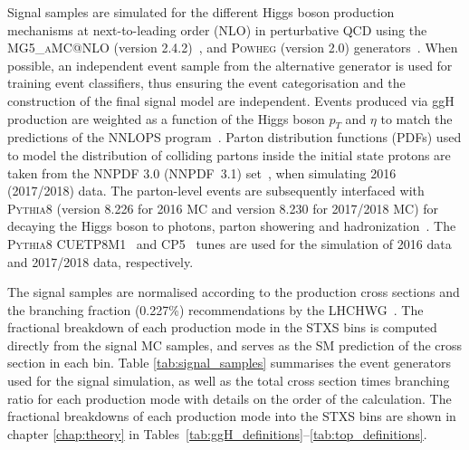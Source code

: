 Signal samples are simulated for the different Higgs boson production mechanisms at next-to-leading order (NLO) in perturbative QCD using the \textsc{MG5\_aMC@NLO} (version 2.4.2)~\cite{Alwall:2014hca}, and \textsc{Powheg} (version 2.0) generators~\cite{Nason:2004rx,Frixione:2007vw,Alioli:2008tz,Nason:2009ai,Alioli:2010xd,Hartanto:2015uka}. When possible, an independent event sample from the alternative generator is used for training event classifiers, thus ensuring the event categorisation and the construction of the final signal model are independent. Events produced via ggH production are weighted as a function of the Higgs boson $p_T$ and $\eta$ to match the predictions of the NNLOPS program~\cite{Hamilton:2013fea}. Parton distribution functions (PDFs) used to model the distribution of colliding partons inside the initial state protons are taken from the NNPDF 3.0 (NNPDF~3.1) set~\cite{Ball:2014uwa,Ball:2017nwa}, when simulating 2016 (2017/2018) data. The parton-level events are subsequently interfaced with \textsc{Pythia8} (version 8.226 for 2016 MC and version 8.230 for 2017/2018 MC) for decaying the Higgs boson to photons, parton showering and hadronization~\cite{Sjostrand:2014zea}. The \textsc{Pythia8} CUETP8M1~\cite{Khachatryan:2015pea} and CP5~\cite{Sirunyan:2019dfx} tunes are used for the simulation of 2016 data and 2017/2018 data, respectively.

The signal samples are normalised according to the production cross sections and the \Hgg branching fraction (0.227\%) recommendations by the LHCHWG~\cite{deFlorian:2016spz}. The fractional breakdown of each production mode in the STXS bins is computed directly from the signal MC samples, and serves as the SM prediction of the cross section in each bin. Table \ref{tab:signal_samples} summarises the event generators used for the signal simulation, as well as the total cross section times branching ratio for each production mode with details on the order of the calculation. The fractional breakdowns of each production mode into the STXS bins are shown in chapter \ref{chap:theory} in Tables~\ref{tab:ggH_definitions}--\ref{tab:top_definitions}.

